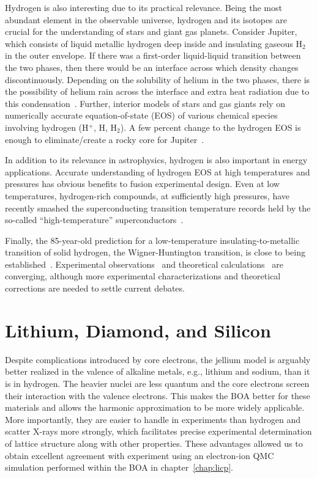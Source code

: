 Hydrogen is also interesting due to its practical relevance. Being the most abundant element in the observable universe, hydrogen and its isotopes are crucial for the understanding of stars and giant gas planets.
Consider Jupiter, which consists of liquid metallic hydrogen deep inside and insulating gaseous H$_2$ in the outer envelope. If there was a first-order liquid-liquid transition between the two phases, then there would be an interface across which density changes discontinuously.
Depending on the solubility of helium in the two phases, there is the possibility of helium rain across the interface and extra heat radiation due to this condensation~\cite{Militzer_thesis}.
Further, interior models of stars and gas giants rely on numerically accurate equation-of-state (EOS) of various chemical species involving hydrogen (H$^+$, H, H$_2$).
A few percent change to the hydrogen EOS is enough to eliminate/create a rocky core for Jupiter~\cite{Hubbard2016}.

In addition to its relevance in astrophysics, hydrogen is also important in energy applications. Accurate understanding of hydrogen EOS at high temperatures and pressures has obvious benefits to fusion experimental design.
Even at low temperatures, hydrogen-rich compounds, at sufficiently high pressures, have recently smashed the superconducting transition temperature records held by the so-called ``high-temperature'' superconductors~\cite{Drozdov2015,Errea2020}.

Finally, the 85-year-old prediction for a low-temperature insulating-to-metallic transition of solid hydrogen, the Wigner-Huntington transition, is close to being established~\cite{Wigner1935,Dias2016,Loubeyre2020}.
Experimental observations~\cite{Dias2016,Loubeyre2020} and theoretical calculations~\cite{McMinis2015,Gorelov2019} are converging, although more experimental characterizations and theoretical corrections are needed to settle current debates.


\section{Lithium, Diamond, and Silicon}
Despite complications introduced by core electrons, the jellium model is arguably better realized in the valence of alkaline metals, e.g., lithium and sodium, than it is in hydrogen.
The heavier nuclei are less quantum and the core electrons screen their interaction with the valence electrons.
This makes the BOA better for these materials and allows the harmonic approximation to be more widely applicable.
More importantly, they are easier to handle in experiments than hydrogen and scatter X-rays more strongly, which facilitates precise experimental determination of lattice structure along with other properties.
These advantages allowed us to obtain excellent agreement with experiment using an electron-ion QMC simulation performed within the BOA in chapter~\ref{chap:licp}.

